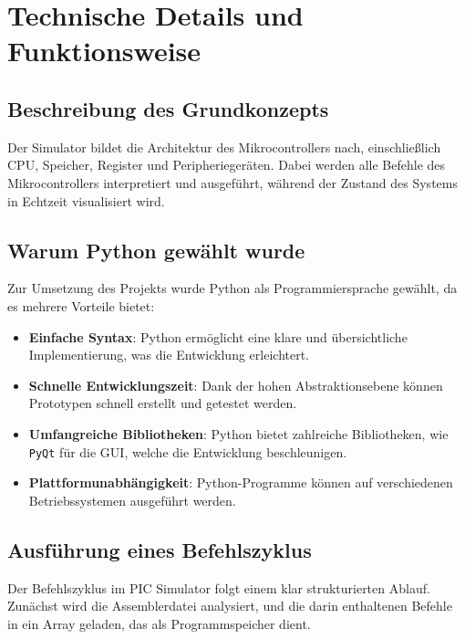 \chapter{Technische Details und Funktionsweise}

\section{Beschreibung des Grundkonzepts}
Der Simulator bildet die Architektur des Mikrocontrollers nach, einschließlich CPU, Speicher, Register und Peripheriegeräten. Dabei werden alle Befehle des Mikrocontrollers interpretiert und ausgeführt, während der Zustand des Systems in Echtzeit visualisiert wird.

\section{Warum Python gewählt wurde}
Zur Umsetzung des Projekts wurde Python als Programmiersprache gewählt, da es mehrere Vorteile bietet:
\begin{itemize}
    \item \textbf{Einfache Syntax}: Python ermöglicht eine klare und übersichtliche Implementierung, was die Entwicklung erleichtert.
    \item \textbf{Schnelle Entwicklungszeit}: Dank der hohen Abstraktionsebene können Prototypen schnell erstellt und getestet werden.
    \item \textbf{Umfangreiche Bibliotheken}: Python bietet zahlreiche Bibliotheken, wie \texttt{PyQt} für die GUI, welche die Entwicklung beschleunigen.
    \item \textbf{Plattformunabhängigkeit}: Python-Programme können auf verschiedenen Betriebssystemen ausgeführt werden.
\end{itemize}

\section{Ausführung eines Befehlszyklus}

Der Befehlszyklus im PIC Simulator folgt einem klar strukturierten Ablauf. Zunächst wird die Assemblerdatei analysiert, und die darin enthaltenen Befehle in ein Array geladen, das als Programmspeicher dient. 

